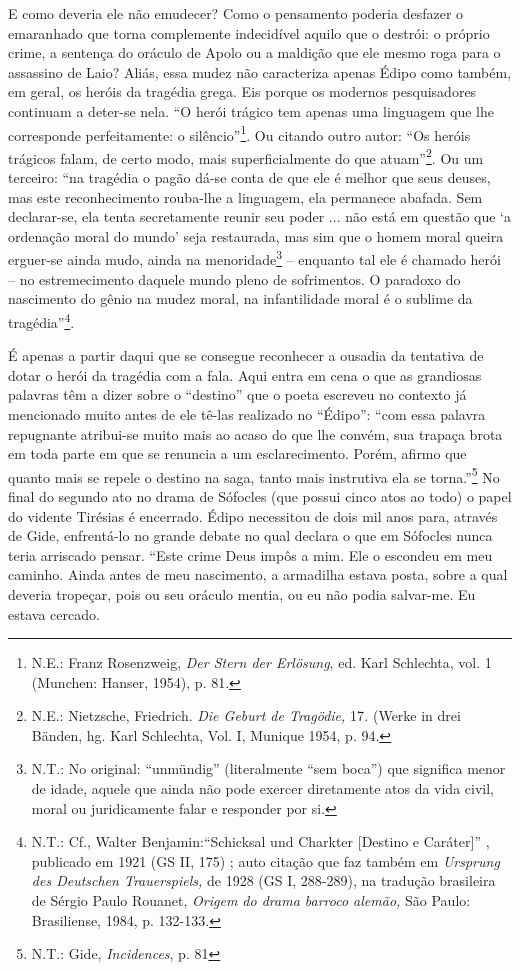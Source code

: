 E como deveria ele não emudecer? Como o pensamento poderia desfazer o
emaranhado que torna complemente indecidível aquilo que o destrói: o
próprio crime, a sentença do oráculo de Apolo ou a maldição que ele
mesmo roga para o assassino de Laio? Aliás, essa mudez não caracteriza
apenas Édipo como também, em geral, os heróis da tragédia grega. Eis
porque os modernos pesquisadores continuam a deter-se nela. ``O herói
trágico tem apenas uma linguagem que lhe corresponde perfeitamente: o
silêncio''\footnote{N.E.: Franz Rosenzweig, \emph{Der Stern der
  Erlösung}, ed. Karl Schlechta, vol. 1 (Munchen: Hanser, 1954), p. 81.}.
Ou citando outro autor: ``Os heróis trágicos falam, de certo modo, mais
superficialmente do que atuam''\footnote{N.E.: Nietzsche, Friedrich.
  \emph{Die Geburt de Tragödie,} 17\emph{.} (Werke in drei Bänden, hg.
  Karl Schlechta, Vol. I, Munique 1954, p. 94.}. Ou um terceiro: ``na
tragédia o pagão dá-se conta de que ele é melhor que seus deuses, mas
este reconhecimento rouba-lhe a linguagem, ela permanece abafada. Sem
declarar-se, ela tenta secretamente reunir seu poder ... não está em
questão que `a ordenação moral do mundo' seja restaurada, mas sim que o
homem moral queira erguer-se ainda mudo, ainda na menoridade\footnote{N.T.:
  No original: ``unmündig'' (literalmente ``sem boca'') que significa
  menor de idade, aquele que ainda não pode exercer diretamente atos da
  vida civil, moral ou juridicamente falar e responder por si.} --
enquanto tal ele é chamado herói -- no estremecimento daquele mundo
pleno de sofrimentos. O paradoxo do nascimento do gênio na mudez moral,
na infantilidade moral é o sublime da tragédia''\footnote{N.T.: Cf.,
  Walter Benjamin:``Schicksal und Charkter {[}Destino e Caráter{]}'' ,
  publicado em 1921 (GS II, 175) ; auto citação que faz também em
  \emph{Ursprung des Deutschen Trauerspiels,} de 1928 (GS I, 288-289),
  na tradução brasileira de Sérgio Paulo Rouanet, \emph{Origem do drama
  barroco alemão,} São Paulo: Brasiliense, 1984, p. 132-133.}.

É apenas a partir daqui que se consegue reconhecer a ousadia da
tentativa de dotar o herói da tragédia com a fala. Aqui entra em cena o
que as grandiosas palavras têm a dizer sobre o ``destino'' que o poeta
escreveu no contexto já mencionado muito antes de ele tê-las realizado
no ``Édipo'': ``com essa palavra repugnante atribui-se muito mais ao
acaso do que lhe convém, sua trapaça brota em toda parte em que se
renuncia a um esclarecimento. Porém, afirmo que quanto mais se repele o
destino na saga, tanto mais instrutiva ela se torna.''\footnote{N.T.:
  Gide, \emph{Incidences}, p. 81} No final do segundo ato no drama de
Sófocles (que possui cinco atos ao todo) o papel do vidente Tirésias é
encerrado. Édipo necessitou de dois mil anos para, através de Gide,
enfrentá-lo no grande debate no qual declara o que em Sófocles nunca
teria arriscado pensar. ``Este crime Deus impôs a mim. Ele o escondeu em
meu caminho. Ainda antes de meu nascimento, a armadilha estava posta,
sobre a qual deveria tropeçar, pois ou seu oráculo mentia, ou eu não
podia salvar-me. Eu estava cercado.

